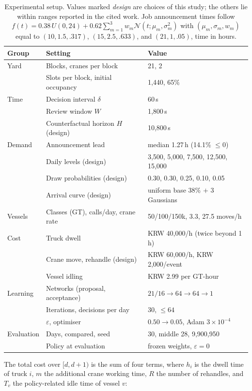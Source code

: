 \documentclass[a4paper]{llncs}
\begin{document}
\begin{table}[tbp]
\centering
\caption{Experimental setup. Values marked \emph{design} are choices of
this study; the others lie within ranges reported in the cited work.
Job announcement times follow
$f(t)=0.38\,U(0,24)+0.62\sum_{m=1}^{3}w_m\mathcal N(t;\mu_m,\sigma_m^2)$
with $(\mu_m,\sigma_m,w_m)$ equal to $(10,1.5,.317)$, $(15,2.5,.633)$,
and $(21,1,.05)$, time in hours.}
\label{tab:setup}
\small
\setlength{\tabcolsep}{4pt}
\begin{tabular}{@{}l l@{\hspace{0.9em}} l@{}}
\toprule
Group & Setting & Value \\
\midrule
Yard & Blocks, cranes per block & 21, 2 \\
 & Slots per block, initial occupancy & 1{,}440, 65\% \\
\midrule
Time & Decision interval $\delta$ & 60\,s \\
 & Review window $W$ & 1{,}800\,s \\
 & Counterfactual horizon $H$ (design) & 10{,}800\,s \\
\midrule
Demand & Announcement lead & median 1.27\,h (14.1\% $\le0$) \\
 & Daily levels (design) & 3{,}500, 5{,}000, 7{,}500, 12{,}500, 15{,}000 \\
 & Draw probabilities (design) & 0.30, 0.30, 0.25, 0.10, 0.05 \\
 & Arrival curve (design) & uniform base 38\% $+$ 3 Gaussians \\
\midrule
Vessels & Classes (GT), calls/day, crane rate & 50/100/150k, 3.3, 27.5 moves/h \\
\midrule
Cost & Truck dwell & KRW 40{,}000/h (twice beyond 1\,h) \\
 & Crane move, rehandle (design) & KRW 60{,}000/h, KRW 2{,}000/event \\
 & Vessel idling & KRW 2.99 per GT-hour~\cite{ref25} \\
\midrule
Learning & Networks (proposal, acceptance) & $21/16\!\to\!64\!\to\!64\!\to\!1$ \\
 & Iterations, decisions per day & 30, $\le64$ \\
 & $\varepsilon$, optimiser & $0.50\!\to\!0.05$, Adam $3\times10^{-4}$ \\
\midrule
Evaluation & Days, compared, seed & 30, middle 28, 9{,}900{,}950 \\
 & Policy at evaluation & frozen weights, $\varepsilon=0$ \\
\bottomrule
\end{tabular}
\end{table}
The total cost over $[d,d+1)$ is the sum of four terms, where $h_i$ is
the dwell time of truck $i$, $m$ the additional crane working time, $R$
the number of rehandles, and $T_v$ the policy-related idle time of
vessel $v$:
\end{document}
